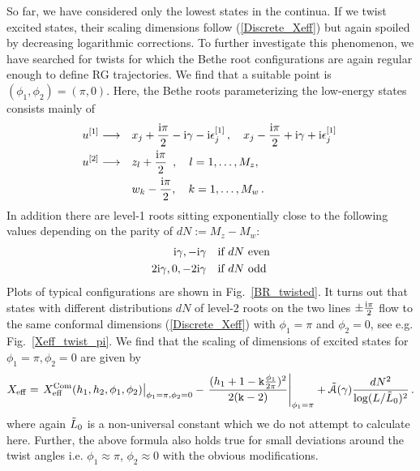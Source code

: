 \documentclass[12pt]{article}
\numberwithin{equation}{section}
\newcommand{\BR}[2]{u^{[#1]}_{#2}}
\newcommand{\ri}{{\rm i}}
\newcommand{\kk}{{\tt k}}
\begin{document}
So far, we have considered only the lowest states in the continua. If we twist excited states, their scaling dimensions follow (\ref{Discrete_Xeff}) but again spoiled by decreasing logarithmic corrections. To further investigate this phenomenon, we have searched for twists for which the Bethe root configurations are again regular enough to define RG trajectories. We find that a suitable point is $(\phi_1,\phi_2)=(\pi,0)$. Here, the Bethe roots parameterizing the low-energy states consists mainly of
\begin{equation}
\begin{aligned}
  \BR{1}{} \longrightarrow&\quad x_j+ \frac{\ri\pi}{2}-\ri\gamma-\ri\epsilon^{[1]}_j\,, \quad x_j- \frac{\ri\pi}{2}+\ri\gamma+\ri\epsilon^{[1]}_j\, \\
  \BR{2}{} \longrightarrow&  \quad z_l+\frac{\ri \pi}{2}\,\,\,, \quad l=1,\dots,M_z, \\
  & \quad w_k-\frac{\ri \pi}{2}, \quad  k=1,\dots,M_w  \,.
\end{aligned}
\end{equation}
In addition there are level-1 roots sitting exponentially close to the following values depending on the parity of $dN :=M_z-M_w$:
\begin{equation}
\label{Singular_roots}
\begin{aligned}
    \ri \gamma,-\ri \gamma \quad &\text{if } dN  \text{ even}\\
    2\ri \gamma,0, -2\ri \gamma \quad &\text{if } dN  \text{ odd} 
\end{aligned}
\end{equation}
Plots of typical configurations are shown in Fig.~\ref{BR_twisted}. It turns out that states with different distributions $dN$ of level-2 roots on the two lines $\pm \frac{\ri \pi}{2}$ flow to the same conformal dimensions (\ref{Discrete_Xeff}) with $\phi_1=\pi$ and $\phi_2=0$, see e.g. Fig.~\ref{Xeff_twist_pi}. We find that the scaling of dimensions of excited states for $\phi_1=\pi, \phi_2=0$ are given by 
\begin{align}
    X_{\rm{eff}}=\left.X^{\rm{Com}}_{\rm{eff}}(h_1,h_2,\phi_1,\phi_2)\right|_{\phi_1=\pi, \phi_2=0}-\left.\frac{(h_{1}+1-\kk \frac{\phi_1}{2\pi})^2}{2( \kk-2)}\right|_{\phi_1=\pi}+\Tilde{\mathcal{A}}(\gamma)\frac{dN^2}{\log(L/\Tilde{L}_0)^2}\,.\label{Xeff_pi}
\end{align}
where again $\Tilde{L}_0$ is a non-universal constant which we do not attempt to calculate here. Further, the above formula also holds true for small deviations around the twist angles i.e. $\phi_1\approx \pi$, $\phi_2\approx 0$ with the obvious modifications. 
\end{document}
